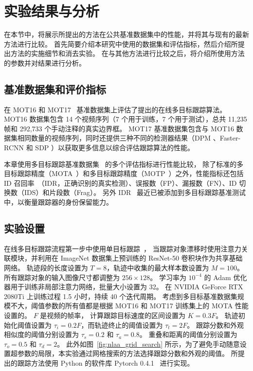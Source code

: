 \section{实验结果与分析}
在本节中，将展示所提出的方法在公共基准数据集中的性能，并将其与现有的最新方法进行比较。 
首先简要介绍本研究中使用的数据集和评估指标，然后介绍所提出方法的实施细节和消去实验。 
在与其他方法进行比较之后，将介绍所使用方法的参数并对结果进行分析。

\subsection{基准数据集和评价指标}
在 MOT16 和 MOT17~\cite{b42} 基准数据集上评估了提出的在线多目标跟踪算法。 
MOT16 数据集包含 14 个视频序列（7 个用于训练，7 个用于测试），总共 11,235 帧和 292,733 个手动注释的真实边界框。
MOT17 基准数据集包含与 MOT16 数据集相同数量的视频序列，同时还提供三种不同的检测器结果（DPM \cite{dpm}、Faster-RCNN \cite{faster-rcnn} 和 SDP \cite{sdp}）以获取更多信息以综合评估跟踪算法的性能。

本章使用多目标跟踪基准数据集~\cite{b42} 的多个评估指标进行性能比较，
除了标准的多目标跟踪精度（MOTA~\cite{b44}）和多目标跟踪精度（MOTP~\cite{b4}）之外，性能指标还包括 ID 召回率~\cite{b45}（IDR，正确识别的真实检测）、误报数（FP）、漏报数（FN）、ID 切换数（IDS）和片段数（Frag）。 
另外 IDR~\cite{b45} 最近已被添加到多目标跟踪基准测试中，以衡量跟踪器的身份保留能力。


\subsection{实验设置}
在线多目标跟踪流程第一步中使用单目标跟踪~\cite{b46}，
当跟踪对象漂移时使用注意力关联模块，并利用在 ImageNet 数据集上预训练的 ResNet-50 卷积块作为共享基础网络。 
轨迹段的长度设置为 $ T=8 $，轨迹中收集的最大样本数设置为 $M=100$。
所有跟踪对象的输入图像尺寸都调整为 $256 \times 128$。
学习率为 $10^{-4}$ 的 Adam 优化器用于训练非局部注意力网络，批量大小设置为 32。
在 NVIDIA GeForce RTX 2080Ti 上训练过程 1.5 小时，持续 40 个迭代周期。
考虑到多目标基准数据集规模不大，阈值参数的所有值都是根据 MOT16 和 MOT17 训练集上的 MOTA 性能设置的。
$ F $ 是视频的帧率，
计算跟踪目标速度的区间设置为 $K=0.3F$。
轨迹初始化阈值设置为 $\tau_i=0.2F$，而轨迹终止的阈值设置为 $\tau_t=2F$。
跟踪分数和外观相似度的阈值分别设置为 $\tau_s=0.2$ 和 $\tau_a=0.8$。
重叠和距离的阈值分别设置为 $\tau_o=0.5$ 和 $\tau_d=2$。
此外如图~\ref{fig:nlaa_grid_search} 所示，为了避免手动随意设置超参数的局限，本实验通过网格搜索的方法选择跟踪分数和外观的阈值。
所提出的跟踪方法使用 Python 的软件库 Pytorch 0.4.1~\cite{b49} 进行实现。


